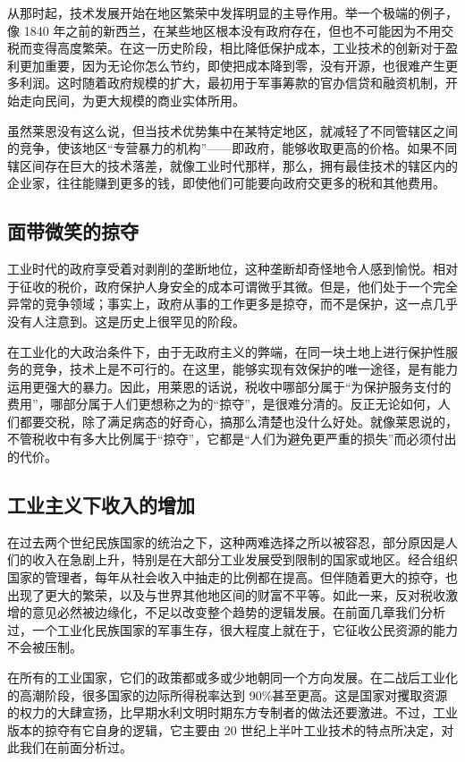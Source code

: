 从那时起，技术发展开始在地区繁荣中发挥明显的主导作用。举一个极端的例子，像 1840 年之前的新西兰，在某些地区根本没有政府存在，但也不可能因为不用交税而变得高度繁荣。在这一历史阶段，相比降低保护成本，工业技术的创新对于盈利更加重要，因为无论你怎么节约，即使把成本降到零，没有开源，也很难产生更多利润。这时随着政府规模的扩大，最初用于军事筹款的官办信贷和融资机制，开始走向民间，为更大规模的商业实体所用。

虽然莱恩没有这么说，但当技术优势集中在某特定地区，就减轻了不同管辖区之间的竞争，使该地区“专营暴力的机构”——即政府，能够收取更高的价格。如果不同辖区间存在巨大的技术落差，就像工业时代那样，那么，拥有最佳技术的辖区内的企业家，往往能赚到更多的钱，即使他们可能要向政府交更多的税和其他费用。

\subsection{面带微笑的掠夺}
工业时代的政府享受着对剥削的垄断地位，这种垄断却奇怪地令人感到愉悦。相对于征收的税价，政府保护人身安全的成本可谓微乎其微。但是，他们处于一个完全异常的竞争领域；事实上，政府从事的工作更多是掠夺，而不是保护，这一点几乎没有人注意到。这是历史上很罕见的阶段。

在工业化的大政治条件下，由于无政府主义的弊端，在同一块土地上进行保护性服务的竞争，技术上是不可行的。在这里，能够实现有效保护的唯一途径，是有能力运用更强大的暴力。因此，用莱恩的话说，税收中哪部分属于“为保护服务支付的费用”，哪部分属于人们更想称之为的“掠夺”，是很难分清的。反正无论如何，人们都要交税，除了满足病态的好奇心，搞那么清楚也没什么好处。就像莱恩说的，不管税收中有多大比例属于“掠夺”，它都是“人们为避免更严重的损失”而必须付出的代价。

\subsection{工业主义下收入的增加}
在过去两个世纪民族国家的统治之下，这种两难选择之所以被容忍，部分原因是人们的收入在急剧上升，特别是在大部分工业发展受到限制的国家或地区。经合组织国家的管理者，每年从社会收入中抽走的比例都在提高。但伴随着更大的掠夺，也出现了更大的繁荣，以及与世界其他地区间的财富不平等。如此一来，反对税收激增的意见必然被边缘化，不足以改变整个趋势的逻辑发展。在前面几章我们分析过，一个工业化民族国家的军事生存，很大程度上就在于，它征收公民资源的能力不会被压制。

在所有的工业国家，它们的政策都或多或少地朝同一个方向发展。在二战后工业化的高潮阶段，很多国家的边际所得税率达到 90\%甚至更高。这是国家对攫取资源的权力的大肆宣扬，比早期水利文明时期东方专制者的做法还要激进。不过，工业版本的掠夺有它自身的逻辑，它主要由 20 世纪上半叶工业技术的特点所决定，对此我们在前面分析过。

